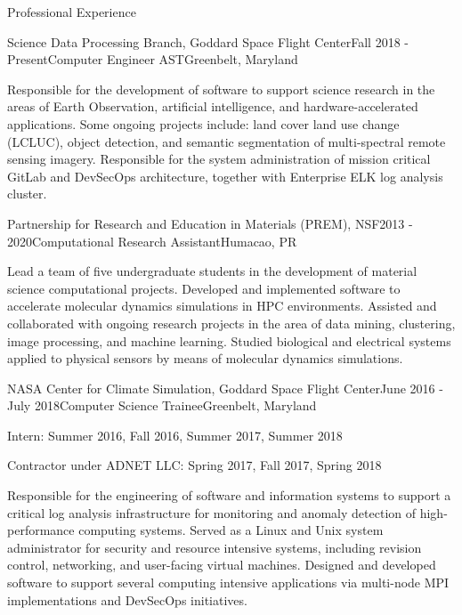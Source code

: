 \documentclass{resume} %
\begin{document}
\begin{rSection}{Professional Experience}

\begin{rSubsection}{Science Data Processing Branch, Goddard Space Flight Center}{Fall 2018 - Present}{Computer Engineer AST}{Greenbelt, Maryland}

Responsible for the development of software to support science research in the areas of Earth Observation, artificial intelligence,  and hardware-accelerated applications.  Some ongoing projects include: land cover land use change (LCLUC), object detection, and semantic segmentation of multi-spectral remote sensing imagery.  Responsible for the system administration of mission critical GitLab and DevSecOps architecture,  together with Enterprise ELK log analysis cluster.
\end{rSubsection}


\begin{rSubsection}{Partnership for Research and Education in Materials (PREM), NSF}{2013 - 2020}{Computational Research Assistant}{Humacao, PR}
\item Lead a team of five undergraduate students in the development of material science computational projects. Developed and implemented software to accelerate molecular dynamics simulations in HPC environments. Assisted and collaborated with ongoing research projects in the area of data mining, clustering, image processing, and machine learning. Studied biological and electrical systems applied to physical sensors by means of molecular dynamics simulations.
\end{rSubsection}

\begin{rSubsection}{NASA Center for Climate Simulation, Goddard Space Flight Center}{June 2016 - July 2018}{Computer Science Trainee}{Greenbelt, Maryland}
\item[] Intern: Summer 2016, Fall 2016, Summer 2017, Summer 2018
\item[] Contractor under ADNET LLC: Spring 2017, Fall 2017, Spring 2018
\item Responsible for the engineering of software and information systems to support a critical log analysis infrastructure for monitoring and anomaly detection of high-performance computing systems. Served as a Linux and Unix system administrator for security and resource intensive systems, including revision control, networking, and user-facing virtual machines. Designed and developed software to support several computing intensive applications via multi-node MPI implementations and DevSecOps initiatives.
\end{rSubsection}

\end{rSection}
\end{document}
